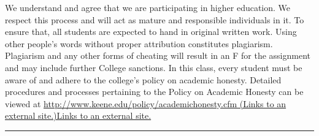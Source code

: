 \documentclass[]{tufte-handout}
\begin{document}
We understand and agree that we are participating in higher education.
We respect this process and will act as mature and responsible
individuals in it. To ensure that, all students are expected to hand in
original written work. Using other people's words without proper
attribution constitutes plagiarism. Plagiarism and any other forms of
cheating will result in an F for the assignment and may include further
College sanctions. In this class, every student must be aware of and
adhere to the college's policy on academic honesty. Detailed procedures
and processes pertaining to the Policy on Academic Honesty can be viewed
at
\href{http://www.keene.edu/policy/academichonesty.cfm}{http://www.keene.edu/policy/academichonesty.cfm
(Links to an external site.)Links to an external site.}

\begin{center}\rule{0.5\linewidth}{0.5pt}\end{center}
\end{document}
